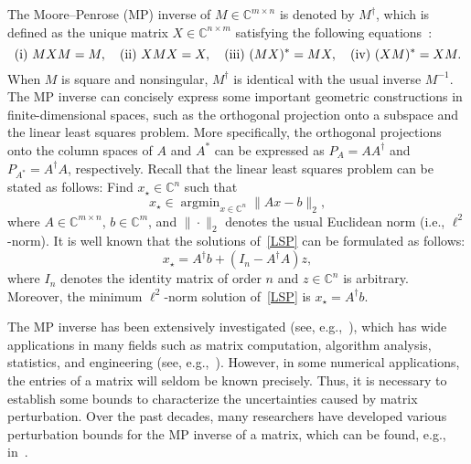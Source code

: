 \documentclass[11pt]{article}
\begin{document}
The Moore--Penrose (MP) inverse of $M\in\mathbb{C}^{m\times n}$ is denoted by $M^{\dagger}$, which is defined as the unique matrix $X\in\mathbb{C}^{n\times m}$ satisfying the following equations~\cite{Penrose1955,Penrose1956}:
\begin{displaymath}
{\rm (i)} \ MXM=M, \quad {\rm (ii)} \ XMX=X, \quad {\rm (iii)} \ (MX)^{\ast}=MX, \quad {\rm (iv)} \ (XM)^{\ast}=XM.
\end{displaymath}
When $M$ is square and nonsingular, $M^{\dagger}$ is identical with the usual inverse $M^{-1}$. The MP inverse can concisely express some important geometric constructions in finite-dimensional spaces, such as the orthogonal projection onto a subspace and the linear least squares problem. More specifically, the orthogonal projections onto the column spaces of $A$ and $A^{\ast}$ can be expressed as $P_{A}=AA^{\dagger}$ and $P_{A^{\ast}}=A^{\dagger}A$, respectively. Recall that the linear least squares problem can be stated as follows: Find $x_{\star}\in\mathbb{C}^{n}$ such that
\begin{equation}\label{LSP}
x_{\star}\in\mathop{\arg\min}_{x\in\mathbb{C}^{n}}\|Ax-b\|_{2},
\end{equation}
where $A\in\mathbb{C}^{m\times n}$, $b\in\mathbb{C}^{m}$, and $\|\cdot\|_{2}$ denotes the usual Euclidean norm (i.e., $\ell^{2}$-norm). It is well known that the solutions of~\eqref{LSP} can be formulated as follows:
\begin{displaymath}
x_{\star}=A^{\dagger}b+(I_{n}-A^{\dagger}A)z,
\end{displaymath}
where $I_{n}$ denotes the identity matrix of order $n$ and $z\in\mathbb{C}^{n}$ is arbitrary. Moreover, the minimum $\ell^{2}$-norm solution of~\eqref{LSP} is $x_{\star}=A^{\dagger}b$.

The MP inverse has been extensively investigated (see, e.g.,~\cite{Boullion1971,Rao1971,Ben2003}), which has wide applications in many fields such as matrix computation, algorithm analysis, statistics, and engineering (see, e.g.,~\cite{Pisinger2007,Drineas2011,Hoyle2011,Smoktunowicz2012,Bodnar2016,Schost2016}). However, in some numerical applications, the entries of a matrix will seldom be known precisely. Thus, it is necessary to establish some bounds to characterize the uncertainties caused by matrix perturbation. Over the past decades, many researchers have developed various perturbation bounds for the MP inverse of a matrix, which can be found, e.g., in~\cite{Ben1966,Stewart1969,Wedin1973,Abdelmalek1974,Stewart1977,Sun2001,Meng2010,Cai2011,Li2018}.
\end{document}
